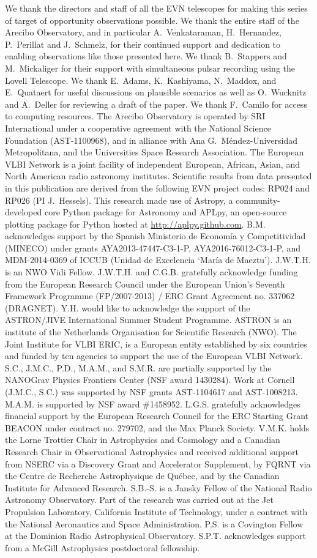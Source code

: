 \documentclass[twocolumn]{aastex61}
\begin{document}
We thank the directors and staff of all the EVN telescopes for making this series of target of opportunity observations possible. We thank the entire staff of the Arecibo Observatory, and in particular A.~Venkataraman, H.~Hernandez, P.~Perillat and J.~Schmelz, for their continued support and dedication to enabling observations like those presented here.  We thank B.~Stappers and M.~Mickaliger for their support with simultaneous pulsar recording using the Lovell Telescope. We thank E.~Adams, K.~Kashiyama, N.~Maddox, and E.~Quataert for useful discussions on plausible scenarios as well as O.~Wucknitz and A.~Deller for reviewing a draft of the paper. We thank F.~Camilo for access to computing resources.  The Arecibo Observatory is operated by SRI International under a cooperative agreement with the National Science Foundation (AST-1100968), and in alliance with Ana G.~M\'{e}ndez-Universidad Metropolitana, and the Universities Space Research Association. The European VLBI Network is a joint facility of independent European, African, Asian, and North American radio astronomy institutes. Scientific results from data presented in this publication are derived from the following EVN project codes: RP024 and RP026 (PI J.~Hessels).  This research made use of Astropy, a community-developed core Python package for Astronomy \citep{astropy2013} and APLpy, an open-source plotting package for Python hosted at \url{http://aplpy.github.com}.  B.M. acknowledges support by the Spanish Ministerio de Econom\'ia y Competitividad (MINECO) under grants AYA2013-47447-C3-1-P, AYA2016-76012-C3-1-P, and MDM-2014-0369 of ICCUB (Unidad de Excelencia `Mar\'ia de Maeztu').  J.W.T.H. is an NWO Vidi Fellow. J.W.T.H. and C.G.B. gratefully acknowledge funding from the European Research Council under the European Union's Seventh Framework Programme (FP/2007-2013) / ERC Grant Agreement no. 337062 (DRAGNET).  Y.H. would like to acknowledge the support of the ASTRON/JIVE International Summer Student Programme. ASTRON is an institute of the Netherlands Organisation for Scientific Research (NWO). The Joint Institute for VLBI ERIC, is a European entity established by six countries and funded by ten agencies to support the use of the European VLBI Network.  S.C., J.M.C., P.D., M.A.M., and S.M.R. are partially supported by the NANOGrav Physics Frontiers Center (NSF award 1430284). Work at Cornell (J.M.C., S.C.) was supported by NSF grants AST-1104617 and AST-1008213.  M.A.M. is supported by NSF award \#1458952.  L.G.S. gratefully acknowledges financial support by the European Research Council for the ERC Starting Grant BEACON under contract no. 279702, and the Max Planck Society.  V.M.K. holds the Lorne Trottier Chair in Astrophysics and Cosmology and a Canadian Research Chair in Observational Astrophysics and received additional support from NSERC via a Discovery Grant and Accelerator Supplement, by FQRNT via the Centre de Recherche Astrophysique de Qu\'ebec, and by the Canadian Institute for Advanced Research.  S.B.-S. is a Jansky Fellow of the National Radio Astronomy Observatory.  Part of the research was carried out at the Jet Propulsion Laboratory, California Institute of Technology, under a contract with the National Aeronautics and Space Administration.  P.S. is a Covington Fellow at the Dominion Radio Astrophysical Observatory.  S.P.T. acknowledges support from a McGill Astrophysics postdoctoral fellowship.

\end{document}
